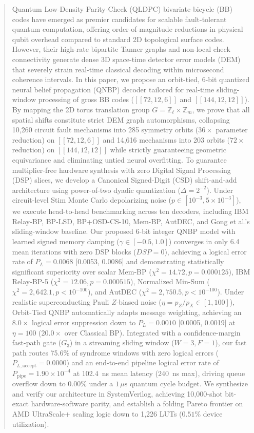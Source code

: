 \documentclass[journal]{IEEEtran}
\begin{document}
\begin{abstract}
Quantum Low-Density Parity-Check (QLDPC) bivariate-bicycle (BB) codes have emerged as premier candidates for scalable fault-tolerant quantum computation, offering order-of-magnitude reductions in physical qubit overhead compared to standard 2D topological surface codes. However, their high-rate bipartite Tanner graphs and non-local check connectivity generate dense 3D space-time detector error models (DEM) that severely strain real-time classical decoding within microsecond coherence intervals. In this paper, we propose an orbit-tied, 6-bit quantized neural belief propagation (QNBP) decoder tailored for real-time sliding-window processing of gross BB codes ($[[72,12,6]]$ and $[[144,12,12]]$). By mapping the 2D torus translation group $G = \mathbb{Z}_\ell \times \mathbb{Z}_m$, we prove that all spatial shifts constitute strict DEM graph automorphisms, collapsing 10,260 circuit fault mechanisms into 285 symmetry orbits ($36\times$ parameter reduction) on $[[72,12,6]]$ and 14,616 mechanisms into 203 orbits ($72\times$ reduction) on $[[144,12,12]]$ while strictly guaranteeing geometric equivariance and eliminating untied neural overfitting. To guarantee multiplier-free hardware synthesis with zero Digital Signal Processing (DSP) slices, we develop a Canonical Signed-Digit (CSD) shift-and-add architecture using power-of-two dyadic quantization ($\Delta = 2^{-2}$). Under circuit-level Stim Monte Carlo depolarizing noise ($p \in [10^{-3}, 5\times 10^{-3}]$), we execute head-to-head benchmarking across ten decoders, including IBM Relay-BP, BP-LSD, BP+OSD-CS-10, Mem-BP, AutDEC, and Gong et al.'s sliding-window baseline. Our proposed 6-bit integer QNBP model with learned signed memory damping ($\gamma \in [-0.5, 1.0]$) converges in only 6.4 mean iterations with zero DSP blocks ($DSP=0$), achieving a logical error rate of $P_L = 0.0068$ [0.0053, 0.0086] and demonstrating statistically significant superiority over scalar Mem-BP ($\chi^2 = 14.72, p = 0.000125$), IBM Relay-BP-5 ($\chi^2 = 12.06, p = 0.000515$), Normalized Min-Sum ($\chi^2 = 2,642.1, p < 10^{-100}$), and AutDEC ($\chi^2 = 2,750.5, p < 10^{-100}$). Under realistic superconducting Pauli $Z$-biased noise ($\eta = p_Z / p_X \in [1, 100]$), Orbit-Tied QNBP automatically adapts message weighting, achieving an $8.0\times$ logical error suppression down to $P_L = 0.0010$ [0.0005, 0.0019] at $\eta=100$ ($20.0\times$ over Classical BP). Integrated with a confidence-margin fast-path gate ($G_3$) in a streaming sliding window ($W=3, F=1$), our fast path routes 75.6\% of syndrome windows with zero logical errors ($P_{L, \text{accept}} = 0.0000$) and an end-to-end pipeline logical error rate of $P_{\text{pipe}} = 1.90 \times 10^{-4}$ at 102.4~ns mean latency (240~ns max), driving queue overflow down to $0.00\%$ under a $1\,\mu\text{s}$ quantum cycle budget. We synthesize and verify our architecture in SystemVerilog, achieving 10,000-shot bit-exact hardware-software parity, and establish a folding Pareto frontier on AMD UltraScale+ scaling logic down to 1,226 LUTs ($0.51\%$ device utilization).
\end{abstract}
\end{document}
